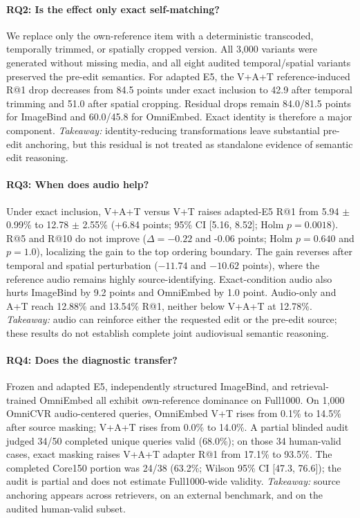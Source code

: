 \documentclass[letterpaper]{article}
\begin{document}
\paragraph{RQ2: Is the effect only exact self-matching?}
We replace only the own-reference item with a deterministic transcoded, temporally trimmed, or spatially cropped version. All 3,000 variants were generated without missing media, and all eight audited temporal/spatial variants preserved the pre-edit semantics. For adapted E5, the V+A+T reference-induced R@1 drop decreases from 84.5 points under exact inclusion to 42.9 after temporal trimming and 51.0 after spatial cropping. Residual drops remain 84.0/81.5 points for ImageBind and 60.0/45.8 for OmniEmbed. Exact identity is therefore a major component. \textit{Takeaway:} identity-reducing transformations leave substantial pre-edit anchoring, but this residual is not treated as standalone evidence of semantic edit reasoning.

\paragraph{RQ3: When does audio help?}
Under exact inclusion, V+A+T versus V+T raises adapted-E5 R@1 from 5.94 $\pm$ 0.99\% to 12.78 $\pm$ 2.55\% (+6.84 points; 95\% CI [5.16, 8.52]; Holm $p=0.0018$). R@5 and R@10 do not improve ($\Delta=-0.22$ and -0.06 points; Holm $p=0.640$ and $p=1.0$), localizing the gain to the top ordering boundary. The gain reverses after temporal and spatial perturbation ($-11.74$ and $-10.62$ points), where the reference audio remains highly source-identifying. Exact-condition audio also hurts ImageBind by 9.2 points and OmniEmbed by 1.0 point. Audio-only and A+T reach 12.88\% and 13.54\% R@1, neither below V+A+T at 12.78\%. \textit{Takeaway:} audio can reinforce either the requested edit or the pre-edit source; these results do not establish complete joint audiovisual semantic reasoning.

\paragraph{RQ4: Does the diagnostic transfer?}
Frozen and adapted E5, independently structured ImageBind, and retrieval-trained OmniEmbed all exhibit own-reference dominance on Full1000. On 1,000 OmniCVR audio-centered queries, OmniEmbed V+T rises from 0.1\% to 14.5\% after source masking; V+A+T rises from 0.0\% to 14.0\%. A partial blinded audit judged 34/50 completed unique queries valid (68.0\%); on those 34 human-valid cases, exact masking raises V+A+T adapter R@1 from 17.1\% to 93.5\%. The completed Core150 portion was 24/38 (63.2\%; Wilson 95\% CI [47.3, 76.6]); the audit is partial and does not estimate Full1000-wide validity. \textit{Takeaway:} source anchoring appears across retrievers, on an external benchmark, and on the audited human-valid subset.
\end{document}
